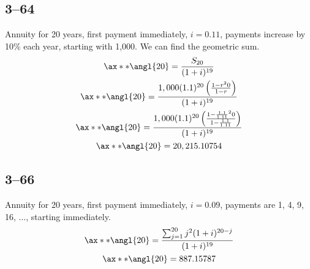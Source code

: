 \documentclass[a4paper, 12pt, reqno]{amsart}
\numberwithin{equation}{section}
\begin{document}
\subsection*{3--64}

Annuity for 20 years, first payment immediately, $i=0.11$, payments increase by
10\% each year, starting with 1,000. We can find the geometric sum.
\begin{equation}\nonumber
    \begin{gathered}
        \ax**{\angl{20}} = \frac{S_{20}}{(1+i)^{19}} \\
        \ax**{\angl{20}} = \frac{1,000(1.1)^{20} \left( \frac{1-r^20}{1-r} 
            \right)}{(1+i)^{19}} \\
        \ax**{\angl{20}} = \frac{1,000(1.1)^{20} \left( \frac{1-\frac{1.1}
            {1.11}^20}{1-\frac{1.1}{1.11}} 
            \right)}{(1+i)^{19}} \\
        \ax**{\angl{20}} = 20,215.10754
    \end{gathered}
\end{equation}

\subsection*{3--66}

Annuity for 20 years, first payment immediately, $i=0.09$, payments are 1, 4,
9, 16, ..., starting immediately.
\begin{equation}\nonumber
    \begin{gathered}
        \ax**{\angl{20}} = \frac{\sum_{j=1}^{20} j^2 (1
            + i)^{20-j}}{(1+i)^{19}}\\
        \ax**{\angl{20}} = 887.15787
    \end{gathered}
\end{equation}
\end{document}
